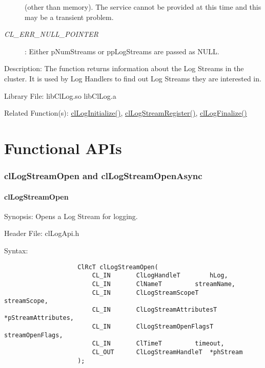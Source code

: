 \begin{flushleft}
\begin{Desc}
\begin{description}
(other than memory). The service cannot be provided at this time and this may be a transient problem.
\item[{\em CL\_\-ERR\_\-NULL\_\-POINTER}]: Either pNumStreams or ppLogStreams are passed as NULL.
\end{description}
\end{Desc}
\begin{Desc}
\item[Description:] The function returns information about the Log Streams in the cluster. It is used by Log Handlers to find out Log Streams 
they are interested in.
\end{Desc}
\begin{Desc}
\item[Library File:] libClLog.so
\newline
libClLog.a\end{Desc}
\begin{Desc}
\item[Related Function(s):]\hyperlink{pagelog101}{clLogInitialize()}, \hyperlink{pagelog112}{clLogStreamRegister()}, 
\hyperlink{pagelog102}{clLogFinalize()}\end{Desc}
\newpage





\section{Functional APIs}
\subsubsection{clLogStreamOpen and clLogStreamOpenAsync}
\hypertarget{pagelog106}{}\paragraph{cl\-Log\-Stream\-Open}\label{pagelog106}
\begin{Desc}
\item[Synopsis:] Opens a Log Stream for logging.  \end{Desc}
\begin{Desc}
\item[Header File:] clLogApi.h \end{Desc}
\begin{Desc}
\item[Syntax:]
\footnotesize\begin{verbatim}        	
					ClRcT clLogStreamOpen(
						CL_IN		ClLogHandleT		hLog,
						CL_IN		ClNameT			streamName,
						CL_IN 		ClLogStreamScopeT		streamScope,
						CL_IN		ClLogStreamAttributesT	*pStreamAttributes,
						CL_IN		ClLogStreamOpenFlagsT	streamOpenFlags,
						CL_IN		ClTimeT			timeout,
						CL_OUT		ClLogStreamHandleT	*phStream
					);
					

\end{verbatim}
\end{Desc}
\end{flushleft}
